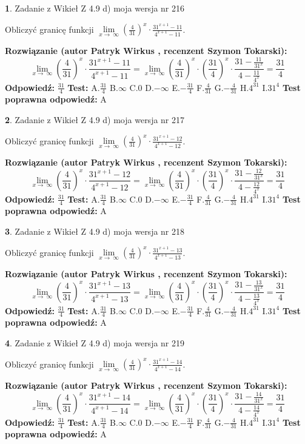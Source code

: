 \documentclass[12pt, a4paper]{article}
\theoremstyle{definition} %
\newtheorem{zad}{}
\newcommand{\zadStart}[1]{\begin{zad}#1\newline}
\newcommand{\zadStop}{\end{zad}}
\newcommand{\rozwStart}[2]{\noindent \textbf{Rozwiązanie (autor #1 , recenzent #2): }\newline}
\newcommand{\rozwStop}{\newline}
\newcommand{\odpStart}{\noindent \textbf{Odpowiedź:}\newline}
\newcommand{\odpStop}{\newline}
\newcommand{\testStart}{\noindent \textbf{Test:}\newline}
\newcommand{\testStop}{\newline}
\newcommand{\kluczStart}{\noindent \textbf{Test poprawna odpowiedź:}\newline}
\newcommand{\kluczStop}{\newline}
\begin{document}
\zadStart{Zadanie z Wikieł Z 4.9 d) moja wersja nr 216}


Obliczyć granicę funkcji  $\lim\limits_{x\to\ \infty}(\frac{4}{31})^{x}\cdot\frac{31^{x+1}-11}{4^{x+1}-11}$.
\zadStop
\rozwStart{Patryk Wirkus}{Szymon Tokarski}
$$\lim\limits_{x\to\ \infty}(\frac{4}{31})^{x}\cdot\frac{31^{x+1}-11}{4^{x+1}-11}=\lim\limits_{x\to\ \infty}(\frac{4}{31})^{x}\cdot(\frac{31}{4})^{x} \cdot \frac{31-\frac{11}{31^{x}}}{4-\frac{11}{4^{x}}} = \frac{31}{4}$$
\rozwStop
\odpStart
$\frac{31}{4}$
\odpStop
\testStart
A.$\frac{31}{4}$ B.$\infty$ C.$0$ D.$-\infty$ E.$-\frac{31}{4}$
F.$\frac{4}{31}$ G.$-\frac{4}{31}$
H.$4^{31}$
I.$31^{4}$
\testStop
\kluczStart
A
\kluczStop



\zadStart{Zadanie z Wikieł Z 4.9 d) moja wersja nr 217}


Obliczyć granicę funkcji  $\lim\limits_{x\to\ \infty}(\frac{4}{31})^{x}\cdot\frac{31^{x+1}-12}{4^{x+1}-12}$.
\zadStop
\rozwStart{Patryk Wirkus}{Szymon Tokarski}
$$\lim\limits_{x\to\ \infty}(\frac{4}{31})^{x}\cdot\frac{31^{x+1}-12}{4^{x+1}-12}=\lim\limits_{x\to\ \infty}(\frac{4}{31})^{x}\cdot(\frac{31}{4})^{x} \cdot \frac{31-\frac{12}{31^{x}}}{4-\frac{12}{4^{x}}} = \frac{31}{4}$$
\rozwStop
\odpStart
$\frac{31}{4}$
\odpStop
\testStart
A.$\frac{31}{4}$ B.$\infty$ C.$0$ D.$-\infty$ E.$-\frac{31}{4}$
F.$\frac{4}{31}$ G.$-\frac{4}{31}$
H.$4^{31}$
I.$31^{4}$
\testStop
\kluczStart
A
\kluczStop



\zadStart{Zadanie z Wikieł Z 4.9 d) moja wersja nr 218}


Obliczyć granicę funkcji  $\lim\limits_{x\to\ \infty}(\frac{4}{31})^{x}\cdot\frac{31^{x+1}-13}{4^{x+1}-13}$.
\zadStop
\rozwStart{Patryk Wirkus}{Szymon Tokarski}
$$\lim\limits_{x\to\ \infty}(\frac{4}{31})^{x}\cdot\frac{31^{x+1}-13}{4^{x+1}-13}=\lim\limits_{x\to\ \infty}(\frac{4}{31})^{x}\cdot(\frac{31}{4})^{x} \cdot \frac{31-\frac{13}{31^{x}}}{4-\frac{13}{4^{x}}} = \frac{31}{4}$$
\rozwStop
\odpStart
$\frac{31}{4}$
\odpStop
\testStart
A.$\frac{31}{4}$ B.$\infty$ C.$0$ D.$-\infty$ E.$-\frac{31}{4}$
F.$\frac{4}{31}$ G.$-\frac{4}{31}$
H.$4^{31}$
I.$31^{4}$
\testStop
\kluczStart
A
\kluczStop



\zadStart{Zadanie z Wikieł Z 4.9 d) moja wersja nr 219}


Obliczyć granicę funkcji  $\lim\limits_{x\to\ \infty}(\frac{4}{31})^{x}\cdot\frac{31^{x+1}-14}{4^{x+1}-14}$.
\zadStop
\rozwStart{Patryk Wirkus}{Szymon Tokarski}
$$\lim\limits_{x\to\ \infty}(\frac{4}{31})^{x}\cdot\frac{31^{x+1}-14}{4^{x+1}-14}=\lim\limits_{x\to\ \infty}(\frac{4}{31})^{x}\cdot(\frac{31}{4})^{x} \cdot \frac{31-\frac{14}{31^{x}}}{4-\frac{14}{4^{x}}} = \frac{31}{4}$$
\rozwStop
\odpStart
$\frac{31}{4}$
\odpStop
\testStart
A.$\frac{31}{4}$ B.$\infty$ C.$0$ D.$-\infty$ E.$-\frac{31}{4}$
F.$\frac{4}{31}$ G.$-\frac{4}{31}$
H.$4^{31}$
I.$31^{4}$
\testStop
\kluczStart
A
\kluczStop
\end{document}

